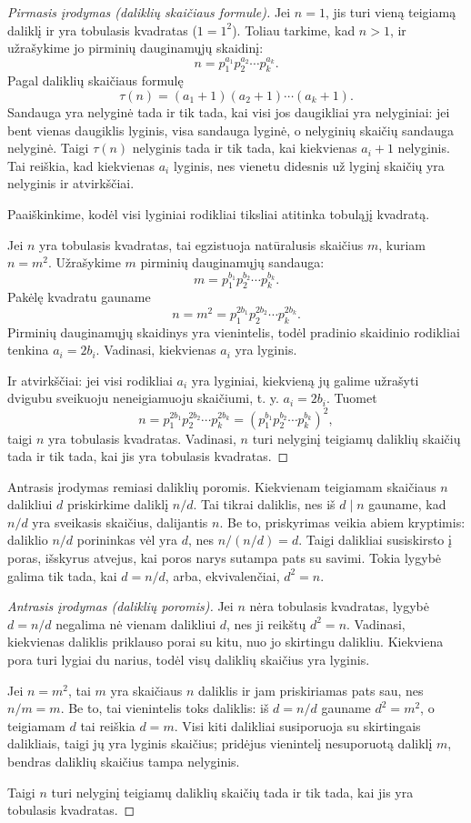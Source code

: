 \documentclass[11pt,a4paper]{scrartcl}
\begin{document}
\begin{proof}[Pirmasis įrodymas (daliklių skaičiaus formule)]
Jei $n=1$, jis turi vieną teigiamą daliklį ir yra tobulasis kvadratas ($1=1^2$). Toliau tarkime, kad $n>1$, ir užrašykime jo pirminių dauginamųjų skaidinį:
\[
    n=p_1^{a_1}p_2^{a_2}\cdots p_k^{a_k}.
\]
Pagal daliklių skaičiaus formulę
\[
    \tau(n)=(a_1+1)(a_2+1)\cdots(a_k+1).
\]
Sandauga yra nelyginė tada ir tik tada, kai visi jos daugikliai yra nelyginiai: jei bent vienas daugiklis lyginis, visa sandauga lyginė, o nelyginių skaičių sandauga nelyginė. Taigi $\tau(n)$ nelyginis tada ir tik tada, kai kiekvienas $a_i+1$ nelyginis. Tai reiškia, kad kiekvienas $a_i$ lyginis, nes vienetu didesnis už lyginį skaičių yra nelyginis ir atvirkščiai.

Paaiškinkime, kodėl visi lyginiai rodikliai tiksliai atitinka tobuląjį kvadratą.

Jei $n$ yra tobulasis kvadratas, tai egzistuoja natūralusis skaičius $m$, kuriam $n=m^2$. Užrašykime $m$ pirminių dauginamųjų sandauga:
\[
    m=p_1^{b_1}p_2^{b_2}\cdots p_k^{b_k}.
\]
Pakėlę kvadratu gauname
\[
    n=m^2=p_1^{2b_1}p_2^{2b_2}\cdots p_k^{2b_k}.
\]
Pirminių dauginamųjų skaidinys yra vienintelis, todėl pradinio skaidinio rodikliai tenkina $a_i=2b_i$. Vadinasi, kiekvienas $a_i$ yra lyginis.

Ir atvirkščiai: jei visi rodikliai $a_i$ yra lyginiai, kiekvieną jų galime užrašyti dvigubu sveikuoju neneigiamuoju skaičiumi, t. y. $a_i=2b_i$. Tuomet
\[
    n=p_1^{2b_1}p_2^{2b_2}\cdots p_k^{2b_k}
    =\left(p_1^{b_1}p_2^{b_2}\cdots p_k^{b_k}\right)^2,
\]
taigi $n$ yra tobulasis kvadratas. Vadinasi, $n$ turi nelyginį teigiamų daliklių skaičių tada ir tik tada, kai jis yra tobulasis kvadratas.
\end{proof}

Antrasis įrodymas remiasi daliklių poromis. Kiekvienam teigiamam skaičiaus $n$ dalikliui $d$ priskirkime daliklį $n/d$. Tai tikrai daliklis, nes iš $d\mid n$ gauname, kad $n/d$ yra sveikasis skaičius, dalijantis $n$. Be to, priskyrimas veikia abiem kryptimis: daliklio $n/d$ porininkas vėl yra $d$, nes $n/(n/d)=d$. Taigi dalikliai susiskirsto į poras, išskyrus atvejus, kai poros narys sutampa pats su savimi. Tokia lygybė galima tik tada, kai $d=n/d$, arba, ekvivalenčiai, $d^2=n$.

\begin{proof}[Antrasis įrodymas (daliklių poromis)]
Jei $n$ nėra tobulasis kvadratas, lygybė $d=n/d$ negalima nė vienam dalikliui $d$, nes ji reikštų $d^2=n$. Vadinasi, kiekvienas daliklis priklauso porai su kitu, nuo jo skirtingu dalikliu. Kiekviena pora turi lygiai du narius, todėl visų daliklių skaičius yra lyginis.

Jei $n=m^2$, tai $m$ yra skaičiaus $n$ daliklis ir jam priskiriamas pats sau, nes $n/m=m$. Be to, tai vienintelis toks daliklis: iš $d=n/d$ gauname $d^2=m^2$, o teigiamam $d$ tai reiškia $d=m$. Visi kiti dalikliai susiporuoja su skirtingais dalikliais, taigi jų yra lyginis skaičius; pridėjus vienintelį nesuporuotą daliklį $m$, bendras daliklių skaičius tampa nelyginis.

Taigi $n$ turi nelyginį teigiamų daliklių skaičių tada ir tik tada, kai jis yra tobulasis kvadratas.
\end{proof}
\end{document}
